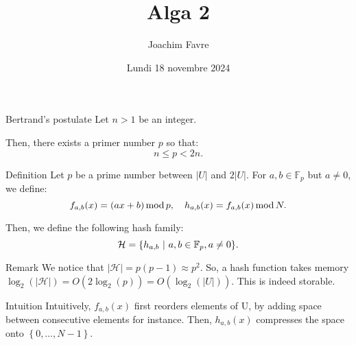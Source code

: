 \documentclass[a4paper]{article}
\title{Alga 2}
\author{Joachim Favre}
\date{Lundi 18 novembre 2024}
\begin{document}
\maketitle


\begin{parag}{Bertrand's postulate}
    Let $n > 1$ be an integer.

    Then, there exists a primer number $p$ so that: 
    \[n \leq p < 2n.\]
\end{parag}

\begin{parag}{Definition}
    Let $p$ be a prime number between $\left|U\right|$ and $2\left|U\right|$. For $a, b \in \mathbb{F}_p$ but $a \neq 0$, we define: 
    \[f_{a, b}\left(x\right) = \left(ax + b\right) \Mod p, \mathspace h_{a, b}\left(x\right) = f_{a, b}\left(x\right) \Mod N.\]
    
   Then, we define the following hash family:  
   \[\mathcal{H} = \left\{h_{a,b} \suchthat a, b \in \mathbb{F}_p, a \neq 0\right\}.\]

   \begin{subparag}{Remark}
       We notice that $\left|\mathcal{H}\right| = p\left(p-1\right) \approx p^2$. So, a hash function takes memory $\log_2\left(\left|\mathcal{H}\right|\right) = O\left(2 \log_2\left(p\right)\right) = O\left(\log_2\left(\left|U\right|\right)\right)$. This is indeed storable.
   \end{subparag}

   \begin{subparag}{Intuition}
       Intuitively, $f_{a, b}\left(x\right)$ first reorders elements of U, by adding space between consecutive elements for instance. Then, $h_{a, b}\left(x\right)$ compresses the space onto $\left\{0, \ldots, N-1\right\}$.
   \end{subparag}
\end{parag}
\end{document}

